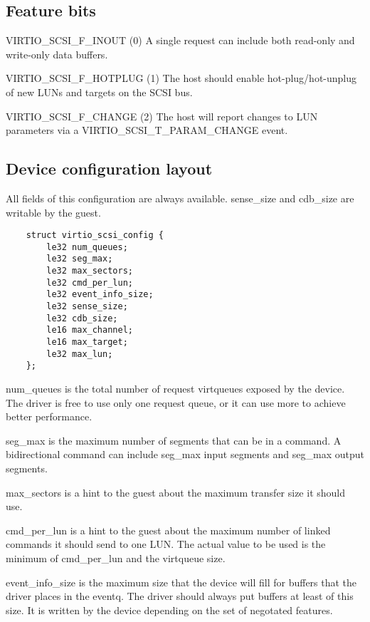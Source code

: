 \subsection{Feature bits}\label{sec:Device Types / SCSI Host Device / Feature bits}

  VIRTIO_SCSI_F_INOUT (0) A single request can include both
    read-only and write-only data buffers.

  VIRTIO_SCSI_F_HOTPLUG (1) The host should enable
    hot-plug/hot-unplug of new LUNs and targets on the SCSI bus.

  VIRTIO_SCSI_F_CHANGE (2) The host will report changes to LUN
    parameters via a VIRTIO_SCSI_T_PARAM_CHANGE event.

\subsection{Device configuration layout}\label{sec:Device Types / SCSI Host Device / Device configuration layout}

  All fields of this configuration are always available. sense_size
  and cdb_size are writable by the guest.

\begin{lstlisting}
	struct virtio_scsi_config {
		le32 num_queues;
		le32 seg_max;
		le32 max_sectors;
		le32 cmd_per_lun;
		le32 event_info_size;
		le32 sense_size;
		le32 cdb_size;
		le16 max_channel;
		le16 max_target;
		le32 max_lun;
	};
\end{lstlisting}

  num_queues is the total number of request virtqueues exposed by
    the device. The driver is free to use only one request queue,
    or it can use more to achieve better performance.

  seg_max is the maximum number of segments that can be in a
    command. A bidirectional command can include seg_max input
    segments and seg_max output segments.

  max_sectors is a hint to the guest about the maximum transfer
    size it should use.

  cmd_per_lun is a hint to the guest about the maximum number of
    linked commands it should send to one LUN. The actual value
    to be used is the minimum of cmd_per_lun and the virtqueue
    size.

  event_info_size is the maximum size that the device will fill
    for buffers that the driver places in the eventq. The driver
    should always put buffers at least of this size. It is
    written by the device depending on the set of negotated
    features.

